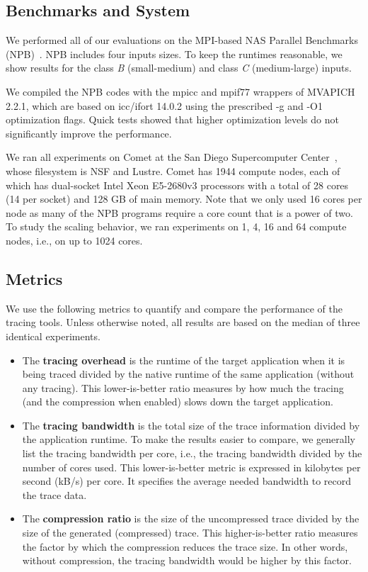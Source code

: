 \subsection{Benchmarks and System}

We performed all of our evaluations on the MPI-based NAS Parallel Benchmarks (NPB)~\cite{nas}. NPB includes four inputs sizes. To keep the runtimes reasonable, we show results for the class \textit{B} (small-medium) and class \textit{C} (medium-large) inputs.

We compiled the NPB codes with the mpicc and mpif77 wrappers of MVAPICH 2.2.1, which are based on icc/ifort 14.0.2 using the prescribed -g and -O1 optimization flags. Quick tests showed that higher optimization levels do not significantly improve the performance.

We ran all experiments on Comet at the San Diego Supercomputer Center~\cite{comet}, whose filesystem is NSF and Lustre. Comet has 1944 compute nodes, each of which has dual-socket Intel Xeon E5-2680v3 processors with a total of 28 cores (14 per socket) and 128 GB of main memory. Note that we only used 16 cores per node as many of the NPB programs require a core count that is a power of two. To study the scaling behavior, we ran experiments on 1, 4, 16 and 64 compute nodes, i.e., on up to 1024 cores.


\subsection{Metrics}

We use the following metrics to quantify and compare the performance of the tracing tools. Unless otherwise noted, all results are based on the median of three identical experiments.
\begin{itemize}
\item The \textbf{tracing overhead} is the runtime of the target application when it is being traced divided by the native runtime of the same application (without any tracing). This lower-is-better ratio measures by how much the tracing (and the compression when enabled) slows down the target application.
\item The \textbf{tracing bandwidth} is the total size of the trace information divided by the application runtime. To make the results easier to compare, we generally list the tracing bandwidth per core, i.e., the tracing bandwidth divided by the number of cores used. This lower-is-better metric is expressed in kilobytes per second (kB/s) per core. It specifies the average needed bandwidth to record the trace data.
\item The \textbf{compression ratio} is the size of the uncompressed trace divided by the size of the generated (compressed) trace. This higher-is-better ratio measures the factor by which the compression reduces the trace size. In other words, without compression, the tracing bandwidth would be higher by this factor.
\end{itemize}


